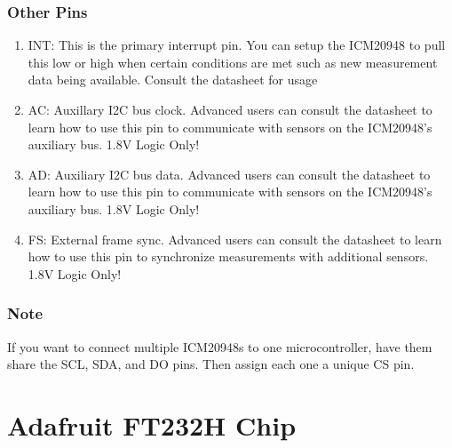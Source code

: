\documentclass[11pt, oneside]{article}   	%
\begin{document}
\subsubsection{Other Pins}
\begin{enumerate}
\item INT: This is the primary interrupt pin. You can setup the ICM20948 to pull this low or high when certain conditions are met such as new measurement data being available. Consult the datasheet for usage
\item AC: Auxillary I2C bus clock. Advanced users can consult the datasheet to learn how to use this pin to communicate with sensors on the ICM20948's auxiliary bus. 1.8V Logic Only!
\item AD: Auxiliary I2C bus data. Advanced users can consult the datasheet to learn how to use this pin to communicate with sensors on the ICM20948's auxiliary bus. 1.8V Logic Only!
\item FS:  External frame sync. Advanced users can consult the datasheet to learn how to use this pin to synchronize measurements with additional sensors. 1.8V Logic Only!
\end{enumerate}

\subsubsection{Note}
If you want to connect multiple ICM20948s to one microcontroller, have them share the SCL, SDA, and DO pins. Then assign each one a unique CS pin.

\newpage
\section{Adafruit FT232H Chip}
\end{document}
